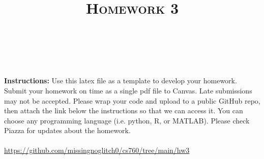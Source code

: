 \documentclass[a4paper]{article}
\title{\textsc{Homework 3}} %
\author{
\red{$>>$Martin Diges$<<$} \\
\red{$>>$9080689699 $<<$}\\
}
\date{}
\theoremstyle{definition}
\begin{document}
\maketitle 


\textbf{Instructions:} 
Use this latex file as a template to develop your homework. Submit your homework on time as a single pdf file to Canvas. Late submissions may not be accepted. Please wrap your code and upload to a public GitHub repo, then attach the link below the instructions so that we can access it. You can choose any programming language (i.e. python, R, or MATLAB). Please check Piazza for updates about the homework.
\\\\
\hypersetup{colorlinks=true, linkcolor=cyan}
\url{https://github.com/missingnoglitch0/cs760/tree/main/hw3}
\end{document}
